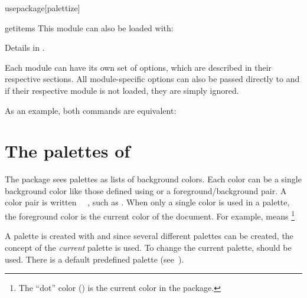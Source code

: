 \documentclass[a4paper, 11pt]{article}
\begin{document}
\begin{macro*}{usepackage}{}[palettize]
\begin{option}{getitems}{}
        This module can also be loaded with:
        \begin{latexcode}
            \usepackage{palettize-getitems}
        \end{latexcode}

        Details in .
    \end{option}

    Each module can have its own set of options, which are described in their respective sections. All module-specific options can also be passed directly to  and if their respective module is not loaded, they are simply ignored.

    As an example, both commands are equivalent:

    \begin{latexcode}
        \usepackage[itemizer, keep-description]{palettize}
    \end{latexcode}

    \vspace{-\baselineskip}
    \begin{latexcode}
        \usepackage[keep-description]{palettize-itemizer}
    \end{latexcode}
\end{macro*}


\section{The palettes of }\label{sec:palettes}

The  package sees palettes as lists of background colors. Each color can be a single background color like those defined using  or a foreground/background pair. A color pair is written ~~, such as . When only a single color is used in a palette, the foreground color is the current color of the document. For example,  means \footnote{The ``dot'' color () is the current color in the  package.}

A palette is created with  and since several different palettes can be created, the concept of the \textit{current} palette is used. To change the current palette,  should be used. There is a default predefined palette (see~).
\end{document}
